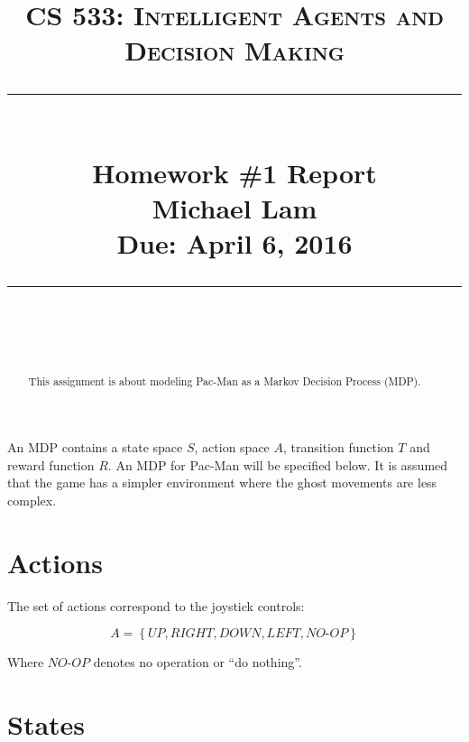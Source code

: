 \documentclass[paper=a4, fontsize=11pt]{scrartcl}
\newcommand{\lecture}{Homework \#1 Report} %
\newcommand{\lecturedate}{Due: April 6, 2016} %
\newcommand{\scribe}{Michael Lam} %
\begin{document}
\newcommand{\horrule}[1]{\rule{\linewidth}{#1}} %

\title{	
\normalfont \normalsize
\vspace{-30pt}
\textsc{CS 533: Intelligent Agents and Decision Making} \\ [10pt]
\horrule{0.5pt} \\[0.4cm] %
\LARGE \lecture\\ %
\vspace{5pt}
\normalsize \scribe\\
\lecturedate\\
\horrule{2pt} \\[0.5cm] %
}


\date{} %

\maketitle
\vspace{-100pt}

\begin{abstract}
This assignment is about modeling Pac-Man as a Markov Decision Process (MDP).
\end{abstract}

An MDP contains a state space $S$, action space $A$, transition function $T$ and reward function $R$. An MDP for Pac-Man will be specified below. It is assumed that the game has a simpler environment where the ghost movements are less complex.

\section{Actions}

The set of actions correspond to the joystick controls:

\begin{equation}
A = \left\{\textit{UP}, \textit{RIGHT}, \textit{DOWN}, \textit{LEFT}, \textit{NO-OP} \right\}
\end{equation}

Where $\textit{NO-OP}$ denotes no operation or ``do nothing''.

\section{States}
\end{document}
